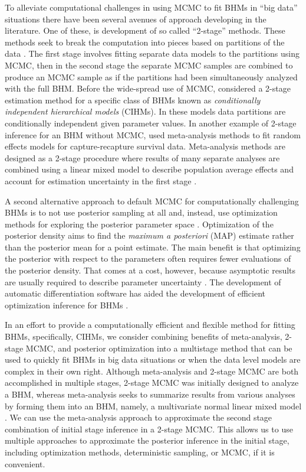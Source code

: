 \documentclass[12pt]{article}
\begin{document}
To alleviate computational challenges in using MCMC to fit BHMs in ``big data'' situations there have been several avenues of approach  developing in the literature. One of these, is development of so called ``2-stage'' methods. These methods seek to break the computation into pieces based on partitions of the data \citep{goudie2019joining, hooten2016hierarchical,hooten2018prior,lunn2013fully,mesquita2020embarrassingly}. The first stage involves fitting separate data models to the partitions using MCMC, then in the second stage the separate MCMC samples are combined to produce an MCMC sample as if the partitions had been simultaneously analyzed with the full BHM. Before the wide-spread use of MCMC, \cite{kass1989approximate} considered a 2-stage estimation method for a specific class of BHMs known as {\it conditionally independent hierarchical models} (CIHMs). In these models data partitions are conditionally independent given parameter values. In another example of 2-stage inference for an BHM without MCMC, \citet{burnham2002evaluation} used meta-analysis methods to fit random effects models for capture-recapture survival data. Meta-analysis methods are designed as a 2-stage procedure where results of many separate analyses are combined using a linear mixed model to describe population average effects and account for estimation uncertainty in the first stage \citep{gasparrini2012multivariate,higgins2009re}. 

A second alternative approach to default MCMC for computationally challenging BHMs is to not use posterior sampling at all and, instead, use  optimization methods for exploring the posterior parameter space \citep{green2015bayesian}. Optimization of the posterior density aims to find the  {\it maximum a posteriori} (MAP) estimate rather than the posterior mean for a point estimate. The main benefit is that optimizing the posterior with respect to the parameters often requires fewer evaluations of the posterior density. That comes at a cost, however, because asymptotic results are usually required to describe parameter uncertainty \citep{van2000asymptotic}. The development of automatic differentiation software has aided the development of efficient optimization inference for BHMs \citep{kristensen2016tmb, skaug2006automatic}.

In an effort to provide a computationally efficient and flexible method for fitting BHMs, specifically, CIHMs, we consider combining benefits of meta-analysis, 2-stage MCMC, and posterior optimization into a multistage method that can be used to quickly fit BHMs in big data situations or when the data level models are complex in their own right. Although meta-analysis and 2-stage MCMC are both accomplished in multiple stages, 2-stage MCMC was initially designed to analyze a BHM, whereas meta-analysis seeks to summarize results from various analyses by forming them into an BHM, namely, a multivariate normal linear mixed model \citep{gasparrini2012multivariate}. We can use the meta-analysis approach to approximate the second stage combination of initial stage inference in a 2-stage MCMC. This allows us to use multiple approaches  to approximate the posterior inference in the initial stage, including optimization methods, deterministic sampling, or MCMC, if it is convenient. 
\end{document}
